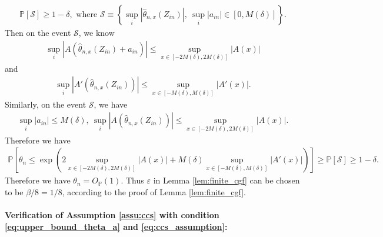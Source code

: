 \documentclass[12pt]{article}
\theoremstyle{definition}
\def\P{\mathbb{P}}
\def\P{\mathbb{P}}
\renewcommand{\P}{\mathbb{P}}							%
\newcommand{\srz}{Z}									%
\begin{document}
\begin{align*}
  \P\left[\mathcal{S}\right]\geq 1-\delta,\text{ where }\mathcal{S}\equiv\left\{\sup_{i}|\widehat{\theta}_{n,x}(\srz_{in})|,\ \sup_{i}|a_{in}|\in [0,M(\delta)]\right\}.
\end{align*}
Then on the event $\mathcal{S}$, we know 
\begin{align*}
  \sup_{i}|A(\widehat{\theta}_{n,x}(\srz_{in})+a_{in})|\leq \sup_{x\in [-2M(\delta),2M(\delta)]}|A(x)|
\end{align*}
and 
\begin{align*}
  \sup_{i}|A'(\widehat{\theta}_{n,x}(\srz_{in}))|\leq \sup_{x\in [-M(\delta),M(\delta)]}|A'(x)|.
\end{align*}
Similarly, on the event $\mathcal{S}$, we have 
\begin{align*}
  \sup_{i}|a_{in}|\leq M(\delta),\ \sup_{i}|A(\widehat{\theta}_{n,x}(\srz_{in}))|\leq \sup_{x\in [-2M(\delta),2M(\delta)]}|A(x)|.
\end{align*}
Therefore we have 
\begin{align*}
  \P\left[\theta_n\leq \exp\left(2\sup_{x\in [-2M(\delta),2M(\delta)]}|A(x)|+M(\delta)\sup_{x\in [-M(\delta),M(\delta)]}|A'(x)|\right)\right]\geq\P[\mathcal{S}]\geq 1-\delta.
\end{align*}
Therefore we have $\theta_n=O_{\P}(1)$. Thus $\varepsilon$ in Lemma \ref{lem:finite_cgf} can be chosen to be $\beta/8=1/8$, according to the proof of Lemma \ref{lem:finite_cgf}.

\paragraph{Verification of Assumption \ref{assu:ccs} with condition \eqref{eq:upper_bound_theta_a} and \eqref{eq:ccs_assumption}:}
\end{document}
